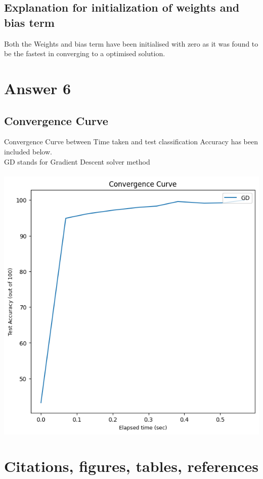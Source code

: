 \documentclass{article}
\begin{document}
\subsection{Explanation for initialization of weights and bias term}
Both the Weights and bias term have been initialised with zero as it was found to be the fastest in converging to a optimised solution.

\section{Answer 6}
\label{A6}
\subsection{Convergence Curve}
Convergence Curve between Time taken and test classification Accuracy has been included below.\\
GD stands for Gradient Descent solver method\\
\\
\includegraphics[scale=1]{images/convergence.png}








\section{Citations, figures, tables, references}
\end{document}
